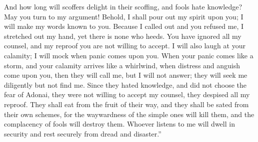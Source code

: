 \begin{biblechapter}
And how long will scoffers delight in their scoffing, 
and fools hate knowledge?
\verse May you turn to my argument! 
Behold, I shall pour out my spirit upon you; 
I will make my words known to you.
\verse Because I called out and you refused me, 
I stretched out my hand, yet there is none who heeds.
\verse You have ignored all my counsel, 
and my reproof you are not willing to accept.
\verse I will also laugh at your calamity; 
I will mock when panic comes upon you.
\verse When your panic comes like a storm, 
and your calamity arrives like a whirlwind, 
when distress and anguish come upon you,
\verse then they will call me, but I will not answer; 
they will seek me diligently but not find me.
\verse Since they hated knowledge, 
and did not choose the fear of Adonai,
\verse they were not willing to accept my counsel, 
they despised all my reproof.
\verse They shall eat from the fruit of their way, 
and they shall be sated from their own schemes,
\verse for the waywardness of the simple ones will kill them, 
and the complacency of fools will destroy them.
\verse Whoever listens to me will dwell in security 
and rest securely from dread and disaster.”
\end{biblechapter}

